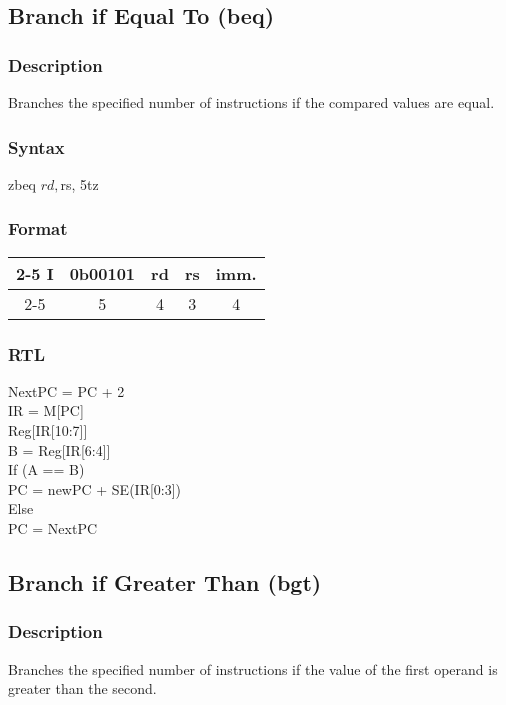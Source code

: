 \documentclass[12pt, a4paper]{report}
\begin{document}
	
	
	\subsection{Branch if Equal To (beq)}
	\subsubsection{Description}
	Branches the specified number of instructions if the compared values are equal.
	\subsubsection{Syntax}
	zbeq    $rd, $rs, 5tz %
	\subsubsection{Format}
	\begin{center}
		{\renewcommand{\arraystretch}{1.5}
			\begin{tabular}[b]{c @{ } c | c | c | c|}
				\cline{2-5}
				I & \vline \hspace{1.5pt} 0b00101 & rd & rs & imm. \\
				\cline{2-5}
				\multicolumn{1}{}{} & \multicolumn{1}{c}{5} & \multicolumn{1}{c}{4}
				& \multicolumn{1}{c}{3} & \multicolumn{1}{c}{4}
			\end{tabular}}
	\end{center}
	\subsubsection{RTL}
	NextPC = PC + 2 \\
	IR = M[PC] \\
	Reg[IR[10:7]] \\
	B = Reg[IR[6:4]] \\
	If (A  ==  B) \\
	PC = newPC + SE(IR[0:3]) \\
	Else \\
	PC = NextPC \\
	
	\subsection{Branch if Greater Than (bgt)}
	\subsubsection{Description}
	Branches the specified number of instructions if the value of the first operand is greater than the second.
\end{document}
